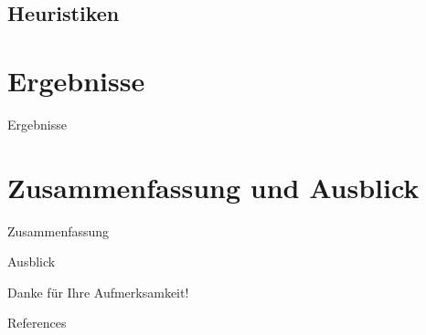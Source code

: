 \documentclass[10pt,table]{beamer}
\begin{document}
\subsection{Heuristiken}

\section{Ergebnisse}
\begin{frame}{Ergebnisse}

\end{frame}

\section{Zusammenfassung und Ausblick}
\begin{frame}{Zusammenfassung}
    
\end{frame}

\begin{frame}{Ausblick}

\end{frame}




\nocite{*}
\appendix
\begin{frame}
\Large\center
Danke für Ihre Aufmerksamkeit!
\end{frame}


\begin{frame}{References}
	
	
\end{frame}
\end{document}
